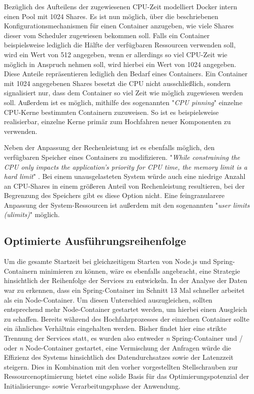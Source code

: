 Bezüglich des Aufteilens der zugewiesenen CPU-Zeit modelliert Docker intern einen Pool mit 1024 Shares. Es ist nun möglich, über die beschriebenen Konfigurationsmechanismen für einen Container anzugeben, wie viele Shares dieser vom Scheduler zugewiesen bekommen soll. Falls ein Container beispielsweise lediglich die Hälfte der verfügbaren Ressourcen verwenden soll, wird ein Wert von 512 angegeben, wenn er allerdings so viel CPU-Zeit wie möglich in Anspruch nehmen soll, wird hierbei ein Wert von 1024 angegeben. Diese Anteile repräsentieren lediglich den Bedarf eines Containers. Ein Container mit 1024 angegebenen Shares besetzt die CPU nicht ausschließlich, sondern signalisiert nur, dass dem Container so viel Zeit wie möglich zugewiesen werden soll. Außerdem ist es möglich, mithilfe des sogenannten "\emph{CPU pinning}" einzelne CPU-Kerne bestimmten Containern zuzuweisen. So ist es beispielsweise realisierbar, einzelne Kerne primär zum Hochfahren neuer Komponenten zu verwenden. 

Neben der Anpassung der Rechenleistung ist es ebenfalls möglich, den verfügbaren Speicher eines Containers zu modifizieren. "\emph{While constraining the CPU only impacts the application’s priority for CPU time, the memory limit is a hard limit}" \cite[Seite~68 ff.]{oreilly-docker}. Bei einem unausgelasteten System würde auch eine niedrige Anzahl an CPU-Shares in einem größeren Anteil von Rechenleistung resultieren, bei der Begrenzung des Speichers gibt es diese Option nicht. Eine feingranularere Anpassung der System-Ressourcen ist außerdem mit den sogenannten "\emph{user limits (ulimits)}" möglich.

\subsection{Optimierte Ausführungsreihenfolge}
Um die gesamte Startzeit bei gleichzeitigem Starten von Node.js und Spring-Containern minimieren zu können, wäre es ebenfalls angebracht, eine Strategie hinsichtlich der Reihenfolge der Services zu entwickeln. In der Analyse der Daten war zu erkennen, dass ein Spring-Container im Schnitt 13 Mal schneller arbeitet als ein Node-Container. Um diesen Unterschied auszugleichen, sollten entsprechend mehr Node-Container gestartet werden, um hierbei einen Ausgleich zu schaffen. Bereits während des Hochfahrprozesses der einzelnen Container sollte ein ähnliches Verhältnis eingehalten werden. Bisher findet hier eine strikte Trennung der Services statt, es wurden also entweder \emph{n} Spring-Container und / oder \emph{n} Node-Container gestartet, eine Vermischung der Anfragen würde die Effizienz des Systems hinsichtlich des Datendurchsatzes sowie der Latenzzeit steigern. Dies in Kombination mit den vorher vorgestellten Stellschrauben zur Ressourcenoptimierung bietet eine solide Basis für das Optimierungspotenzial der Initialisierungs- sowie Verarbeitungsphase der Anwendung.

